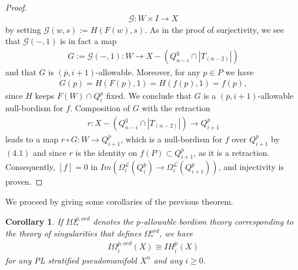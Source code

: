 \documentclass{scrreprt}
\newtheorem{corollar}[prop]{Corollary}
\begin{document}
\begin{proof}
\begin{align*}
\mathcal{G}: W \times I \to X
\end{align*}
by setting $\mathcal{G}(w,s):=H(F(w),s)$. As in the proof of surjectivity, we see that $\mathcal{G}(-,1)$ is in fact a map
\begin{align*}
G:=\mathcal{G}(-,1): W \to X-(Q_{n-i}^{\overline{q}} \cap |T_{(n-2)}|)
\end{align*}
and that $G$ is $(\overline{p},i+1)$-allowable. Moreover, for any $p \in P$ we have
\begin{align}
G(p)=H(F(p),1)=H(f(p),1)=f(p),
\end{align}
since $H$ keeps $F(W) \cap Q_i^{\overline{p}}$ fixed. We conclude that $G$ is a $(\overline{p},i+1)$-allowable null-bordism for $f$. Composition of $G$ with the retraction
\begin{align*}
r: X-(Q_{n-i}^{\overline{q}} \cap |T_{(n-2)}|) \to Q_{i+1}^{\overline{p}}
\end{align*}
leads to a map
$r \circ G : W \to Q_{i+1}^{\overline{p}}$, which is a null-bordism for $f$ over $Q_{i+1}^{\overline{p}}$ by $(4.1)$ and since $r$ is the identity on $f(P) \subset Q_{i+1}^{\overline{p}}$, as it is a retraction. Consequently, $[f] =0$ in $Im(\Omega_i^{\mathcal{L}}(Q_{i}^{\overline{p}}) \to \Omega_i^{\mathcal{L}}(Q_{i+1}^{\overline{p}}))$, and injectivity is proven.
\end{proof}

We proceed by giving some corollaries of the previous theorem.

\begin{corollar}
If $I\Omega_*^{\overline{p},ord}$ denotes the $\overline{p}$-allowable bordism theory corresponding to the theory of singularities that defines $\Omega_*^{ord}$, we have
\begin{align*}
I\Omega_i^{\overline{p},ord}(X) \cong IH_i^{\overline{p}}(X)
\end{align*}
for any PL stratified pseudomanifold $X^n$ and any $i \geq 0$.
\end{corollar}
\end{document}
